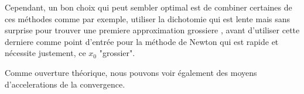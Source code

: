 \documentclass{article}
\begin{document}
    Cependant, un bon choix qui peut sembler optimal est de combiner certaines de ces méthodes comme par exemple, utiliser la dichotomie qui est lente mais sans surprise pour trouver une premiere approximation grossiere , avant d'utiliser cette derniere comme point d'entrée pour la méthode de Newton qui est rapide et nécessite justement, ce $x_0$ "grossier".
    
    Comme ouverture théorique, nous pouvons voir également des moyens d'accelerations de la convergence. 
\end{document}
